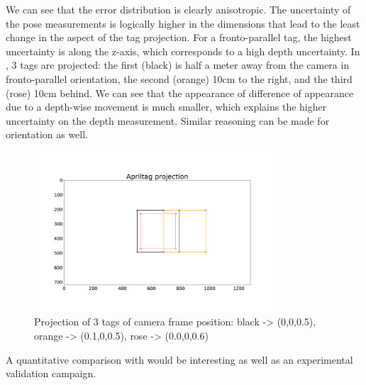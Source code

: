 We can see that the error distribution is clearly anisotropic. The uncertainty of the pose measurements
is logically higher in the dimensions that lead to the least change in the aspect of the tag projection. For a fronto-parallel tag, the highest 
uncertainty is along the z-axis, which corresponds to a high depth uncertainty.
In , 3 tags are projected: the first (black) is half a meter away from the camera in fronto-parallel orientation, the second (orange)
10cm to the right, and the third (rose) 10cm behind. We can see that the appearance of difference of appearance due to a depth-wise movement is much smaller, which 
explains the higher uncertainty on the depth measurement. Similar reasoning can be made for orientation as well. 

\begin{figure}[h]
    \centering
    \includegraphics[width=0.8\textwidth]{figures/apriltag_proj.pdf}
    \caption{Projection of 3 tags of camera frame position: black -> (0,0,0.5), orange -> (0.1,0,0.5), rose -> (0.0,0,0.6)}
    \label{fig:apriltag_proj}
\end{figure}

A quantitative comparison with \cite{urban2016mlpnp} would be interesting as well as an experimental validation campaign.


